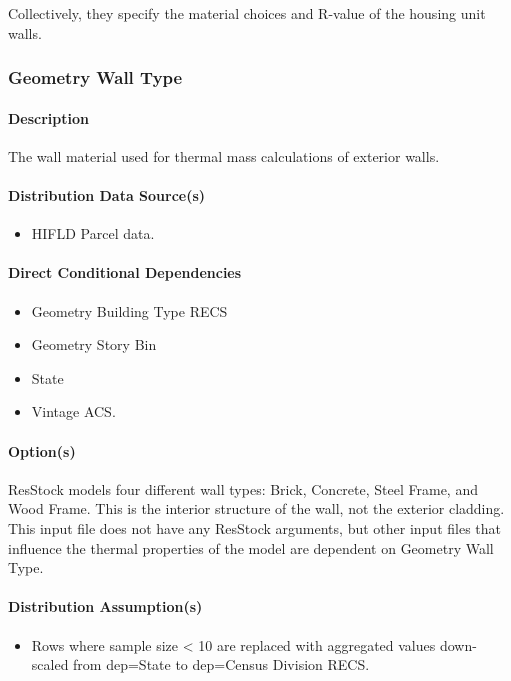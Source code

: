 Collectively, they specify the material choices and R-value of the housing unit walls. 

\subsubsection{Geometry Wall Type}\label{geometry_wall_type}
\paragraph{Description}
The wall material used for thermal mass calculations of exterior walls.

\paragraph{Distribution Data Source(s)}
\begin{itemize}
 
\item
  HIFLD Parcel data.
\end{itemize}

\paragraph{Direct Conditional Dependencies}

\begin{itemize}
    \item Geometry Building Type RECS
    \item Geometry Story Bin
    \item State
    \item Vintage ACS.
\end{itemize}
\paragraph{Option(s)}
ResStock models four different wall types: Brick, Concrete, Steel Frame, and Wood Frame. This is the interior structure of the wall, not the exterior cladding. This input file does not have any ResStock arguments, but other input files that influence the thermal properties of the model are dependent on Geometry Wall Type.

\paragraph{Distribution Assumption(s)}
\begin{itemize}
 
\item
  Rows where sample size \textless{} 10 are replaced with aggregated
  values down-scaled from dep=\textquotesingle State\textquotesingle{}
  to dep=\textquotesingle Census Division RECS\textquotesingle{}.
\end{itemize}

